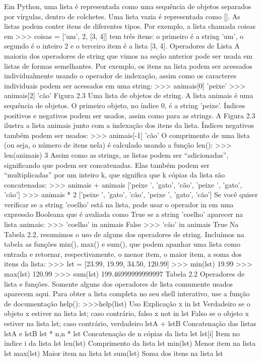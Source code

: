 			Em Python, uma lista é representada como uma sequência de objetos separados por vírgulas,
			dentro de colchetes. Uma lista vazia é representada como []. As listas podem conter itens de
			diferentes tipos. Por exemplo, a lista chamada coisas em
			>>> coisas = ['um', 2, [3, 4]]
			tem três itens: o primeiro é a string 'um', o segundo é o inteiro 2 e o terceiro item é a lista [3,
			4].
			Operadores de Lista
			A maioria dos operadores de string que vimos na seção anterior pode ser usada em listas de formas
			semelhantes. Por exemplo, os itens na lista podem ser acessados individualmente usando o
			operador de indexação, assim como os caracteres individuais podem ser acessados em uma string:
			>>> animais[0]
			'peixe'
			>>> animais[2]
			'cão'
			Figura 2.3 Uma lista de objetos de string. A lista animais é uma sequência de objetos. O
			primeiro objeto, no índice 0, é a string 'peixe'. Índices positivos e negativos podem ser usados,
			assim como para as strings.
			A Figura 2.3 ilustra a lista animais junto com a indexação dos itens da lista. Índices negativos
			também podem ser usados:
			>>> animais[-1]
			'cão'
			O comprimento de uma lista (ou seja, o número de itens nela) é calculado usando a
			função len():
			>>> len(animais)
			3
			Assim como as strings, as listas podem ser “adicionadas”, significando que podem
			ser concatenadas. Elas também podem ser “multiplicadas” por um inteiro k, que significa
			que k cópias da lista são concatenadas:
			>>> animais + animais
			['peixe ', 'gato', 'cão', 'peixe ', 'gato', 'cão']
			>>> animais * 2
			['peixe ', 'gato', 'cão', 'peixe ', 'gato', 'cão']
			Se você quiser verificar se a string 'coelho' está na lista, pode usar o operador in em uma
			expressão Booleana que é avaliada como True se a string 'coelho' aparecer na
			lista animais:
			>>> 'coelho' in animais
			False
			>>> 'cão' in animais
			True
			Na Tabela 2.2, resumimos o uso de alguns dos operadores de string. Incluímos na tabela as
			funções min(), max() e sum(), que podem apanhar uma lista como entrada e retornar,
			respectivamente, o menor item, o maior item, a soma dos itens da lista:
			>>> lst = [23.99, 19.99, 34.50, 120.99]
			>>> min(lst)
			19.99
			>>> max(lst)
			120.99
			>>> sum(lst)
			199.46999999999997
			Tabela 2.2 Operadores de lista e funções. Somente alguns dos operadores de lista comumente
			usados aparecem aqui. Para obter a lista completa no seu shell interativo, use a função de
			documentação help(): >>>help(list)
			Uso Explicação
			x in lst Verdadeiro se o objeto x estiver na lista lst; caso contrário, falso
			x not in lst Falso se o objeto x estiver na lista lst; caso contrário, verdadeiro
			lstA + lstB Concatenação das listas lstA e lstB
			lst * n,n * lst Concatenação de n cópias da lista lst
			lst[i] Item no índice i da lista lst
			len(lst) Comprimento da lista lst
			min(lst) Menor item na lista lst
			max(lst) Maior item na lista lst
			sum(lst) Soma dos itens na lista lst
			
